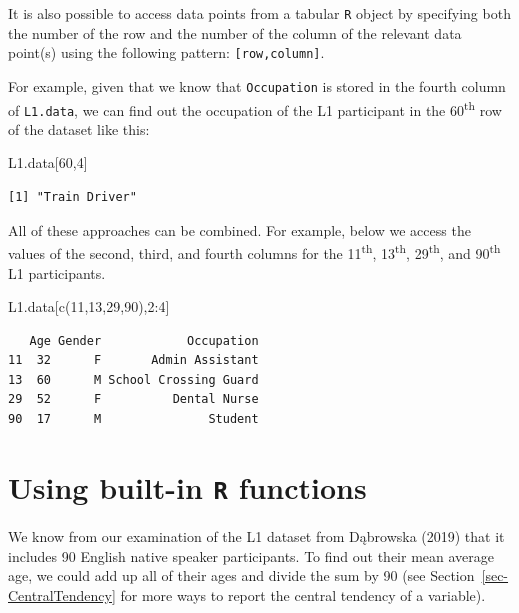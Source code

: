 \documentclass[
  letterpaper,
  DIV=11,
  numbers=noendperiod]{scrreprt}
\newenvironment{Shaded}{\begin{snugshade}}{\end{snugshade}}
\newcommand{\DecValTok}[1]{\textcolor[rgb]{0.68,0.00,0.00}{#1}}
\newcommand{\FunctionTok}[1]{\textcolor[rgb]{0.28,0.35,0.67}{#1}}
\newcommand{\NormalTok}[1]{\textcolor[rgb]{0.00,0.23,0.31}{#1}}
\newcommand{\SpecialCharTok}[1]{\textcolor[rgb]{0.37,0.37,0.37}{#1}}
\begin{document}
It is also possible to access data points from a tabular \texttt{R}
object by specifying both the number of the row and the number of the
column of the relevant data point(s) using the following pattern:
\texttt{{[}row,column{]}}.

For example, given that we know that \texttt{Occupation} is stored in
the fourth column of \texttt{L1.data}, we can find out the occupation of
the L1 participant in the 60\textsuperscript{th} row of the dataset like
this:

\begin{Shaded}
\begin{Highlighting}[]
\NormalTok{L1.data[}\DecValTok{60}\NormalTok{,}\DecValTok{4}\NormalTok{]}
\end{Highlighting}
\end{Shaded}

\begin{verbatim}
[1] "Train Driver"
\end{verbatim}

All of these approaches can be combined. For example, below we access
the values of the second, third, and fourth columns for the
11\textsuperscript{th}, 13\textsuperscript{th}, 29\textsuperscript{th},
and 90\textsuperscript{th} L1 participants.

\begin{Shaded}
\begin{Highlighting}[]
\NormalTok{L1.data[}\FunctionTok{c}\NormalTok{(}\DecValTok{11}\NormalTok{,}\DecValTok{13}\NormalTok{,}\DecValTok{29}\NormalTok{,}\DecValTok{90}\NormalTok{),}\DecValTok{2}\SpecialCharTok{:}\DecValTok{4}\NormalTok{]}
\end{Highlighting}
\end{Shaded}

\begin{verbatim}
   Age Gender            Occupation
11  32      F       Admin Assistant
13  60      M School Crossing Guard
29  52      F          Dental Nurse
90  17      M               Student
\end{verbatim}

\section{\texorpdfstring{Using built-in \texttt{R}
functions}{Using built-in R functions}}\label{sec-RFunctions}

We know from our examination of the L1 dataset from Dąbrowska (2019)
that it includes 90 English native speaker participants. To find out
their mean average age, we could add up all of their ages and divide the
sum by 90 (see Section~\ref{sec-CentralTendency} for more ways to report
the central tendency of a variable).
\end{document}
